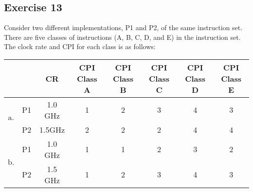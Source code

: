 \documentclass[12pt]{article}
\begin{document}
\subsection*{Exercise 13}
Consider two different implementations, P1 and P2, of the same instruction set. There are five classes of instructions (A, B, C, D, and E) in the instruction set. The clock rate and CPI for each class is as follows:
\begin{center}
\begin{tabular}{| c | c | c | c | c | c | c | c |}
\hline
\multicolumn{2}{|c|}{} & CR & CPI Class A & CPI Class B & CPI Class C & CPI Class D & CPI Class E \\
\hline
\multirow{2}{*}{a.} & P1 & 1.0 GHz & 1 & 2 & 3 & 4 & 3 \\
\cline{3-8}
& P2 & 1.5GHz & 2 & 2 & 2 & 4 & 4 \\
\hline
\multirow{2}{*}{b.} & P1 & 1.0 GHz & 1 & 1 & 2 & 3 & 2 \\
\cline{3-8}
& P2 & 1.5 GHz & 1 & 2 & 3 & 4 & 3 \\
\hline
\end{tabular}
\end{center}
\end{document}
